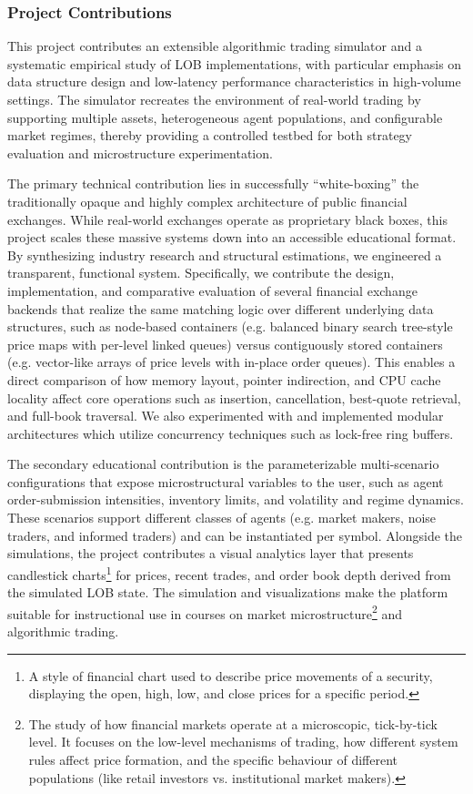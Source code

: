 \documentclass[12pt,a4paper]{article}
\begin{document}
\subsubsection{Project Contributions}
This project contributes an extensible algorithmic trading simulator and a systematic empirical study of LOB implementations, with particular emphasis on data structure design and low-latency performance characteristics in high-volume settings. The simulator recreates the environment of real-world trading by supporting multiple assets, heterogeneous agent populations, and configurable market regimes, thereby providing a controlled testbed for both strategy evaluation and microstructure experimentation.

The primary technical contribution lies in successfully ``white-boxing'' the traditionally opaque and highly complex architecture of public financial exchanges. While real-world exchanges operate as proprietary black boxes, this project scales these massive systems down into an accessible educational format. By synthesizing industry research and structural estimations, we engineered a transparent, functional system. Specifically, we contribute the design, implementation, and comparative evaluation of several financial exchange backends that realize the same matching logic over different underlying data structures, such as node-based containers (e.g. balanced binary search tree-style price maps with per-level linked queues) versus contiguously stored containers (e.g. vector-like arrays of price levels with in-place order queues). This enables a direct comparison of how memory layout, pointer indirection, and CPU cache locality affect core operations such as insertion, cancellation, best-quote retrieval, and full-book traversal. We also experimented with and implemented modular architectures which utilize concurrency techniques such as lock-free ring buffers.

The secondary educational contribution is the parameterizable multi-scenario configurations that expose microstructural variables to the user, such as agent order-submission intensities, inventory limits, and volatility and regime dynamics. These scenarios support different classes of agents (e.g. market makers, noise traders, and informed traders) and can be instantiated per symbol. Alongside the simulations, the project contributes a visual analytics layer that presents candlestick charts\footnote{A style of financial chart used to describe price movements of a security, displaying the open, high, low, and close prices for a specific period.} for prices, recent trades, and order book depth derived from the simulated LOB state. The simulation and visualizations make the platform suitable for instructional use in courses on market microstructure\footnote{The study of how financial markets operate at a microscopic, tick-by-tick level. It focuses on the low-level mechanisms of trading, how different system rules affect price formation, and the specific behaviour of different populations (like retail investors vs. institutional market makers).} and algorithmic trading.
\end{document}
